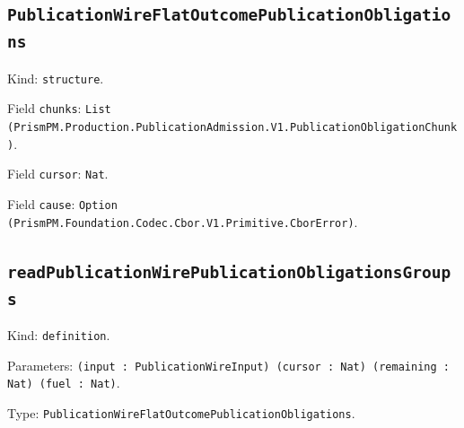 \documentclass[11pt]{article}
\begin{document}
\subsection*{\texttt{PublicationWireFlatOutcomePublicationObligations}}
\noindent Kind: \texttt{structure}.\par
\noindent Field \texttt{chunks}: \texttt{List (PrismPM.Production.PublicationAdmission.V1.PublicationObligationChunk)}.\par
\noindent Field \texttt{cursor}: \texttt{Nat}.\par
\noindent Field \texttt{cause}: \texttt{Option (PrismPM.Foundation.Codec.Cbor.V1.Primitive.CborError)}.\par
\subsection*{\texttt{readPublicationWirePublicationObligationsGroups}}
\noindent Kind: \texttt{definition}.\par
\noindent Parameters: \texttt{(input : PublicationWireInput) (cursor : Nat) (remaining : Nat) (fuel : Nat)}.\par
\noindent Type: \texttt{PublicationWireFlatOutcomePublicationObligations}.\par
\end{document}
